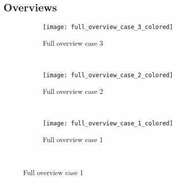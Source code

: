 










\subsection{Overviews}

\begin{figure}[H]
    \centering
    \begin{subfigure}[t]{0.3\textwidth}
        \centering
        \texttt{[image: full\_overview\_case\_3\_colored]}
        \caption{\label{fig:full_overview_case3_colored} Full overview case 3}
    \end{subfigure}%
    ~
    \begin{subfigure}[t]{0.3\textwidth}
        \centering
        \texttt{[image: full\_overview\_case\_2\_colored]}
        \caption{\label{fig:full_overview_case2_colored} Full overview case 2}
    \end{subfigure}%
    ~
    \begin{subfigure}[t]{0.3\textwidth}
        \centering
        \texttt{[image: full\_overview\_case\_1\_colored]}
        \caption{\label{fig:full_overview_case1_colored} Full overview case 1}
    \end{subfigure}%
    ~
\end{figure}